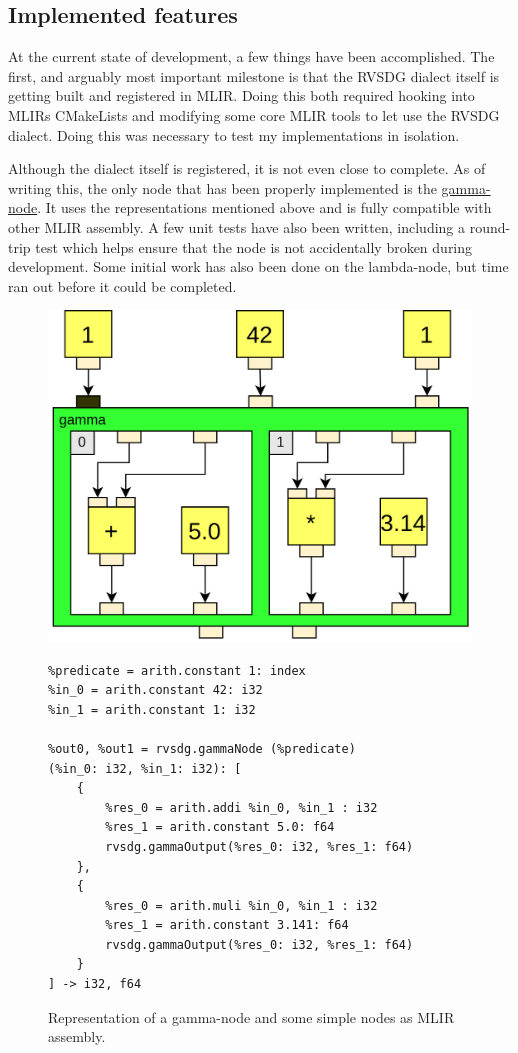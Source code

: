 \subsection{Implemented features}
At the current state of development, a few things have been accomplished. The first, and arguably most important milestone is that the RVSDG dialect itself is getting built and registered in MLIR. Doing this both required hooking into MLIRs CMakeLists and modifying some core MLIR tools to let use the RVSDG dialect. Doing this was necessary to test my implementations in isolation.

Although the dialect itself is registered, it is not even close to complete. As of writing this, the only node that has been properly implemented is the \hyperref[lbl:gamma-node]{gamma-node}. It uses the representations mentioned above and is fully compatible with other MLIR assembly. A few unit tests have also been written, including a round-trip test which helps ensure that the node is not accidentally broken during development. Some initial work has also been done on the lambda-node, but time ran out before it could be completed.

\begin{figure}[H]
    \centering
    \includegraphics[width=\textwidth/3]{Images/example_mlir_assembly_cropped.png}
    \begin{verbatim}
%predicate = arith.constant 1: index
%in_0 = arith.constant 42: i32
%in_1 = arith.constant 1: i32

%out0, %out1 = rvsdg.gammaNode (%predicate) 
(%in_0: i32, %in_1: i32): [
    {
        %res_0 = arith.addi %in_0, %in_1 : i32
        %res_1 = arith.constant 5.0: f64
        rvsdg.gammaOutput(%res_0: i32, %res_1: f64)
    },
    {
        %res_0 = arith.muli %in_0, %in_1 : i32
        %res_1 = arith.constant 3.141: f64
        rvsdg.gammaOutput(%res_0: i32, %res_1: f64)
    }
] -> i32, f64
    \end{verbatim}
    \caption{Representation of a gamma-node and some simple nodes as MLIR assembly.}
    \label{fig:my_label}
\end{figure}
